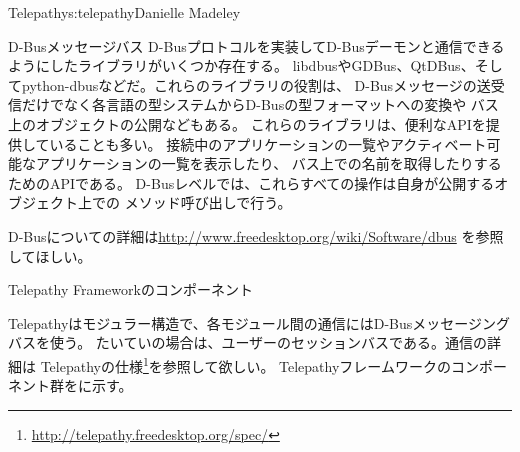 \begin{aosachapter}{Telepathy}{s:telepathy}{Danielle Madeley}
\begin{aosabox}{D-Busメッセージバス}
D-Busプロトコルを実装してD-Busデーモンと通信できるようにしたライブラリがいくつか存在する。
libdbusやGDBus、QtDBus、そしてpython-dbusなどだ。これらのライブラリの役割は、
D-Busメッセージの送受信だけでなく各言語の型システムからD-Busの型フォーマットへの変換や
バス上のオブジェクトの公開などもある。
これらのライブラリは、便利なAPIを提供していることも多い。
接続中のアプリケーションの一覧やアクティベート可能なアプリケーションの一覧を表示したり、
バス上での名前を取得したりするためのAPIである。
D-Busレベルでは、これらすべての操作は自身が公開するオブジェクト上での
メソッド呼び出しで行う。

D-Busについての詳細は\url{http://www.freedesktop.org/wiki/Software/dbus}
を参照してほしい。

\end{aosabox}

\begin{aosasect1}{Telepathy Frameworkのコンポーネント}

Telepathyはモジュラー構造で、各モジュール間の通信にはD-Busメッセージングバスを使う。
たいていの場合は、ユーザーのセッションバスである。通信の詳細は
Telepathyの仕様\footnote{\url{http://telepathy.freedesktop.org/spec/}}を参照して欲しい。
Telepathyフレームワークのコンポーネント群をに示す。

\begin{aosaitemize}


\end{aosaitemize}
\end{aosasect1}
\end{aosachapter}
